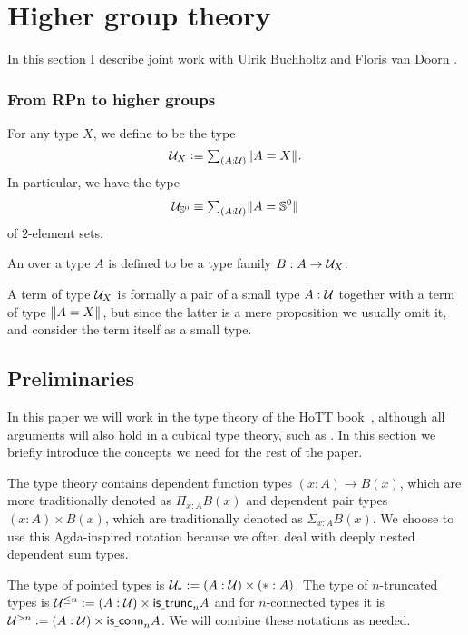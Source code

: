 \chapter{Higher group theory}
In this section I describe joint work with Ulrik Buchholtz and Floris van Doorn \cite{BuchholtzDoornRijke}.

\subsection{From RPn to higher groups}
\begin{defn}
For any type $X$, we define  to be the type \[\UU_X\defeq\sm{A:\UU}\brck{A=X}.\] In particular, we have the type \[\UU_{\sphere{0}}\jdeq\sm{A:\UU}\brck{A={\sphere{0}}}\] of $2$\nobreakdash-element sets.

An  over a type $A$ is defined to be a type family $B:A\to\mathcal{U}_X$. 
\end{defn}

A term of type $\mathcal{U}_X$ is formally a pair of a small type $A:\mathcal{U}$ together with a term of type $\Vert A=X\Vert_{}$, but since the latter is a mere proposition we usually omit it, and consider the term itself as a small type.

\section{Preliminaries}
\label{sec:preliminaries}

In this paper we will work in the type theory of the HoTT book~\cite{hottbook}, although all arguments will also hold in a cubical type theory, such as \cite{CCHM2016,chtt}. In this section we briefly introduce the concepts we need for the rest of the paper.

The type theory contains dependent function types $(x : A) \to B(x)$, which are more traditionally denoted as $\Pi_{x : A}B(x)$ and dependent pair types $(x : A) \times B(x)$, which are traditionally denoted as $\Sigma_{x : A}B(x)$. We choose to use this Agda-inspired notation because we often deal with deeply nested dependent sum types.

The type of pointed types is
$\mathcal{U}_\ast := (A : \mathcal{U}) \times (\ast : A)$. The type of $n$-truncated types is
$\mathcal{U}^{\le n} := (A : \mathcal{U}) \times \mathsf{is\underline{\ }{}trunc}_{n}{A}$ and for $n$-connected types it is
$\mathcal{U}^{>n} := (A : \mathcal{U}) \times \mathsf{is\underline{\ }{}conn}_n A$. We will combine these notations as needed.

